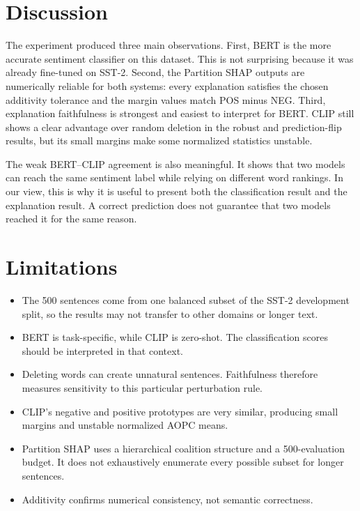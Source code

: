 \documentclass[11pt,a4paper]{article}
\begin{document}
\section{Discussion}

The experiment produced three main observations. First, BERT is the more accurate sentiment classifier on this dataset. This is not surprising because it was already fine-tuned on SST-2. Second, the Partition SHAP outputs are numerically reliable for both systems: every explanation satisfies the chosen additivity tolerance and the margin values match POS minus NEG. Third, explanation faithfulness is strongest and easiest to interpret for BERT. CLIP still shows a clear advantage over random deletion in the robust and prediction-flip results, but its small margins make some normalized statistics unstable.

The weak BERT--CLIP agreement is also meaningful. It shows that two models can reach the same sentiment label while relying on different word rankings. In our view, this is why it is useful to present both the classification result and the explanation result. A correct prediction does not guarantee that two models reached it for the same reason.

\section{Limitations}

\begin{itemize}
  \item The 500 sentences come from one balanced subset of the SST-2 development split, so the results may not transfer to other domains or longer text.
  \item BERT is task-specific, while CLIP is zero-shot. The classification scores should be interpreted in that context.
  \item Deleting words can create unnatural sentences. Faithfulness therefore measures sensitivity to this particular perturbation rule.
  \item CLIP's negative and positive prototypes are very similar, producing small margins and unstable normalized AOPC means.
  \item Partition SHAP uses a hierarchical coalition structure and a 500-evaluation budget. It does not exhaustively enumerate every possible subset for longer sentences.
  \item Additivity confirms numerical consistency, not semantic correctness.
\end{itemize}
\end{document}
